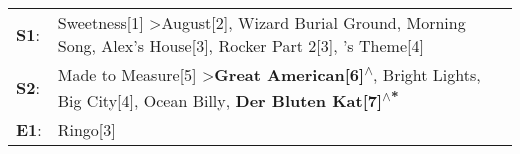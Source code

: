 \begin{supertabular}{p{0.03\textwidth}p{0.92\textwidth}}
 \textbf{S1}:  &  Sweetness[1]\textsuperscript{} \textgreater \enspace August[2]\textsuperscript{}, \enspace Wizard Burial Ground\textsuperscript{}, \enspace Morning Song\textsuperscript{}, \enspace Alex's House[3]\textsuperscript{}, \enspace Rocker Part 2[3]\textsuperscript{}, 's Theme[4]\textsuperscript{}  \enspace  \\
 \textbf{S2}:  &                                 Made to Measure[5]\textsuperscript{} \textgreater \enspace \textbf{Great American[6]\textsuperscript{$\wedge$}}, \enspace Bright Lights, Big City[4]\textsuperscript{}, \enspace Ocean Billy\textsuperscript{}, \enspace \textbf{Der Bluten Kat[7]\textsuperscript{$\wedge$*}}  \enspace  \\
 \textbf{E1}:  &                                                                                                                                                                                                                                                                                     Ringo[3]\textsuperscript{}  \enspace  \\
\end{supertabular}
